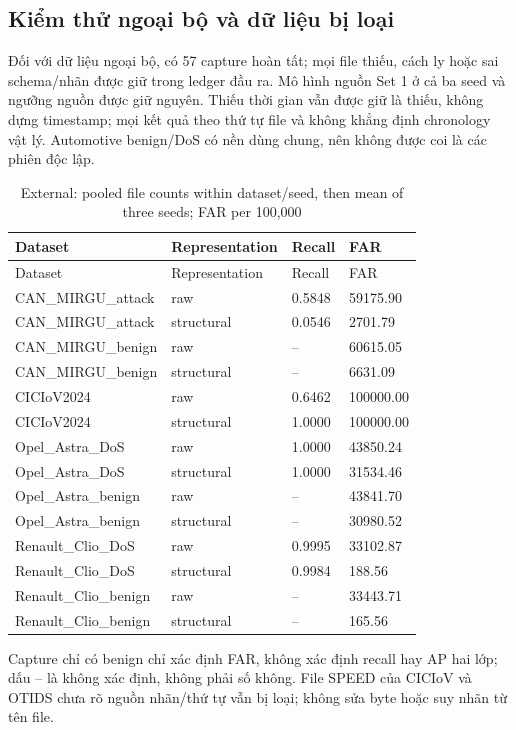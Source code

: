 \documentclass[12pt,a4paper,oneside,openany]{extbook}
\begin{document}
\subsection{Kiểm thử ngoại bộ và dữ liệu bị loại}
Đối với dữ liệu ngoại bộ, có 57 capture hoàn tất; mọi file thiếu, cách ly hoặc sai schema/nhãn được giữ trong ledger đầu ra. Mô hình nguồn Set 1 ở cả ba seed và ngưỡng nguồn được giữ nguyên. Thiếu thời gian vẫn được giữ là thiếu, không dựng timestamp; mọi kết quả theo thứ tự file và không khẳng định chronology vật lý. Automotive benign/DoS có nền dùng chung, nên không được coi là các phiên độc lập.
\begin{longtable}{P{4.4cm}P{3.1cm}P{2.0cm}P{2.4cm}}
\caption{External: pooled file counts within dataset/seed, then mean of three seeds; FAR per 100,000}\label{tab:extension-external}\\\toprule
Dataset & Representation & Recall & FAR\\\midrule\endfirsthead
\toprule
Dataset & Representation & Recall & FAR\\\midrule\endhead
CAN\_MIRGU\_attack & raw & 0.5848 & 59175.90\\
CAN\_MIRGU\_attack & structural & 0.0546 & 2701.79\\
CAN\_MIRGU\_benign & raw & -- & 60615.05\\
CAN\_MIRGU\_benign & structural & -- & 6631.09\\
CICIoV2024 & raw & 0.6462 & 100000.00\\
CICIoV2024 & structural & 1.0000 & 100000.00\\
Opel\_Astra\_DoS & raw & 1.0000 & 43850.24\\
Opel\_Astra\_DoS & structural & 1.0000 & 31534.46\\
Opel\_Astra\_benign & raw & -- & 43841.70\\
Opel\_Astra\_benign & structural & -- & 30980.52\\
Renault\_Clio\_DoS & raw & 0.9995 & 33102.87\\
Renault\_Clio\_DoS & structural & 0.9984 & 188.56\\
Renault\_Clio\_benign & raw & -- & 33443.71\\
Renault\_Clio\_benign & structural & -- & 165.56\\
\bottomrule\end{longtable}
Capture chỉ có benign chỉ xác định FAR, không xác định recall hay AP hai lớp; dấu -- là không xác định, không phải số không. File SPEED của CICIoV và OTIDS chưa rõ nguồn nhãn/thứ tự vẫn bị loại; không sửa byte hoặc suy nhãn từ tên file.
\end{document}
